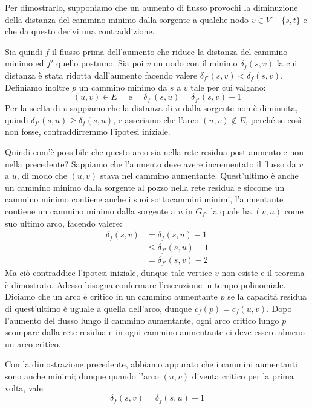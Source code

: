 \noindent Per dimostrarlo, supponiamo che un aumento di flusso provochi la diminuzione della distanza del cammino minimo dalla sorgente a qualche nodo
$v\in V - \{s,t\}$ e che da questo derivi una contraddizione.\par
Sia quindi $f$ il flusso prima dell'aumento che riduce la distanza del cammino minimo ed $f'$ quello postumo. Sia poi $v$ un nodo con il minimo
$\delta_f(s,v)$ la cui distanza è stata ridotta dall'aumento facendo valere $\delta_{f'}(s,v) < \delta_f(s,v)$. Definiamo inoltre $p$ un cammino minimo
da $s$ a $v$ tale per cui valgano: \[
	(u,v)\in E\quad \text{ e }\quad \delta_{f'}(s,u) = \delta_{f'}(s,v)-1
\]
\noindent Per la scelta di $v$ sappiamo che la distanza di $u$ dalla sorgente non è diminuita, quindi $\delta_{f'}(s,u) \geq \delta_f(s,u)$, e
asseriamo che l'arco $(u,v)\notin E$, perché se così non fosse, contraddirremmo l'ipotesi iniziale.\par
Quindi com'è possibile che questo arco sia nella rete residua post-aumento e non nella precedente? Sappiamo che l'aumento deve avere incrementato il
flusso da $v$ a $u$, di modo che $(u,v)$ stava nel cammino aumentante. Quest'ultimo è anche un cammino minimo dalla sorgente al pozzo nella rete residua
e siccome un cammino minimo contiene anche i suoi sottocammini minimi, l'aumentante contiene un cammino minimo dalla sorgente a $u$ in $G_f$, la quale
ha $(v,u)$ come suo ultimo arco, facendo valere: \begin{equation}
	\begin{split}
		\delta_f(s,v) &= \delta_f(s,u)-1\\
			&\leq \delta_{f'}(s,u)-1\\
			&= \delta_{f'}(s,v)-2
	\end{split}
\end{equation}
\noindent Ma ciò contraddice l'ipotesi iniziale, dunque tale vertice $v$ non esiste e il teorema è dimostrato. Adesso bisogna confermare l'esecuzione
in tempo polinomiale. Diciamo che un arco è critico in un cammino aumentante $p$ se la capacità residua di quest'ultimo è uguale a quella dell'arco,
dunque $c_f(p) = c_f(u,v)$. Dopo l'aumento del flusso lungo il cammino aumentante, ogni arco critico lungo $p$ scompare dalla rete residua e in ogni
cammino aumentante ci deve essere almeno un arco critico.\par
Con la dimostrazione precedente, abbiamo appurato che i cammini aumentanti sono anche minimi; dunque quando l'arco $(u,v)$ diventa critico per la prima
volta, vale: \[
	\delta_f(s,v) = \delta_f(s,u)+1
\]
